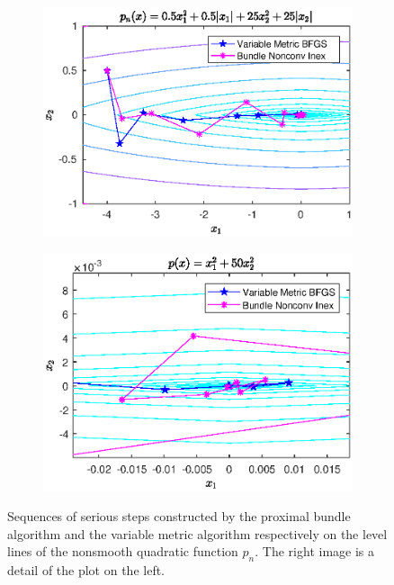 \begin{figure}[H]
	\begin{subfigure}[t]{0.49\textwidth}
		\includegraphics[width=\textwidth]{Pictures/Plots/final_nonsm_parab.eps}
	\end{subfigure}
	\begin{subfigure}[t]{0.49\textwidth}
			\includegraphics[width=\textwidth]{Pictures/Plots/final_nonsm_parab_detail.eps}
	\end{subfigure}
	\caption{Sequences of serious steps constructed by the proximal bundle algorithm and the variable metric algorithm respectively on the level lines of the nonsmooth quadratic function \(p_n\). The right image is a detail of the plot on the left.}
	\label{fig_contour_nonsm_parab}
\end{figure}

